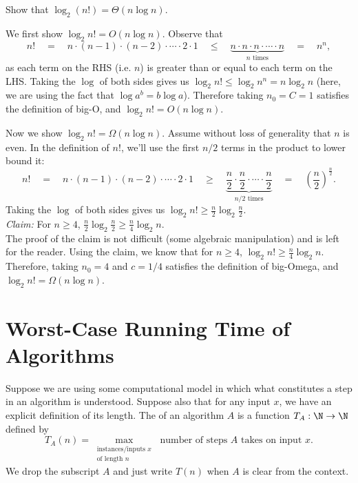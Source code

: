 \begin{flex}
\begin{exercise}  \label{exercise:Practice-with-Theta}
Show that $\log_2 (n!) = \Theta(n \log n)$.
\end{exercise}

\begin{solution}
We first show $\log_2 n! = O(n \log n)$. Observe that
\[
n! \quad = \quad n \cdot (n-1) \cdot (n-2) \cdot \cdots \cdot 2 \cdot 1 \quad \leq \quad \underbrace{n \cdot n \cdot n \cdot \cdots \cdot n}_{n \text{ times}} \quad = \quad n^n,
\]
as each term on the RHS (i.e. $n$) is greater than or equal to each term on the LHS. Taking the $\log$ of both sides gives us $\log_2 n! \leq \log_2 n^n = n \log_2 n$ (here, we are using the fact that $\log a^b = b \log a$). Therefore taking $n_0 = C = 1$ satisfies the definition of big-O, and $\log_2 n! = O(n \log n)$.

Now we show $\log_2 n! = \Omega(n \log n)$. Assume without loss of generality that $n$ is even. In the definition of $n!$, we'll use the first $n/2$ terms in the product to lower bound it:
\[
n! \quad = \quad n \cdot (n-1) \cdot (n-2) \cdot \cdots \cdot 2 \cdot 1 \quad \geq \quad \underbrace{\frac{n}{2} \cdot \frac{n}{2} \cdot \cdots \cdot \frac{n}{2}}_{n/2 \text{ times} } \quad = \quad \left(\frac{n}{2}\right)^{\frac{n}{2}}.
\]
Taking the $\log$ of both sides gives us $\log_2 n! \geq \frac{n}{2} \log_2 \frac{n}{2}$.
\\

\noindent
\emph{Claim:} For $n \geq 4$, $\frac{n}{2} \log_2 \frac{n}{2} \geq \frac{n}{4} \log_2 n$.
\\

The proof of the claim is not difficult (some algebraic manipulation) and is left for the reader. Using the claim, we know that for $n \geq 4$, $\log_2 n! \geq  \frac{n}{4} \log_2 n$. Therefore, taking $n_0 = 4$ and $c = 1/4$ satisfies the definition of big-Omega, and $\log_2 n! = \Omega(n \log n)$.
\end{solution}
\end{flex}




\section{Worst-Case Running Time of Algorithms}


\begin{definition} \label{definition:Worst-case-running-time-of-an-algorithm}
Suppose we are using some computational model in which what constitutes a step in an algorithm is understood. Suppose also that for any input $x$, we have an explicit definition of its length. The  of an algorithm $A$ is a function $T_A : \N \to \N$ defined by
\[
T_A(n) = \max_{\substack{\text{instances/inputs $x$} \\ \text{of length $n$}}} \text{ number of steps $A$ takes on input $x$}.
\]
We drop the subscript $A$ and just write $T(n)$ when $A$ is clear from the context.
\end{definition}


